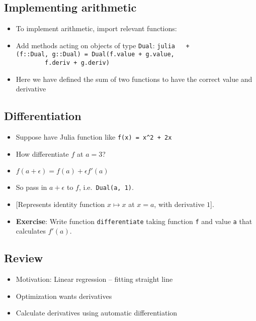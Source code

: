 \hypertarget{implementing-arithmetic}{%
\subsection{Implementing arithmetic}\label{implementing-arithmetic}}

\begin{itemize}
\item
  To implement arithmetic, import relevant functions:

\begin{Shaded}
\begin{Highlighting}[]
\end{Highlighting}
\end{Shaded}
\item
  Add methods acting on objects of type \texttt{Dual}:
  \texttt{julia\ \ \ +(f::Dual,\ g::Dual)\ =\ Dual(f.value\ +\ g.value,\ \ \ \ \ \ \ \ \ \ \ \ \ \ \ \ \ \ \ \ \ \ \ \ \ \ \ \ \ \ \ f.deriv\ +\ g.deriv)}
\item
  Here we have defined the sum of two functions to have the correct
  value and derivative
\end{itemize}

\hypertarget{differentiation}{%
\subsection{Differentiation}\label{differentiation}}

\begin{itemize}
\item
  Suppose have Julia function like \texttt{f(x)\ =\ x\^{}2\ +\ 2x}
\item
  How differentiate \(f\) at \(a = 3\)?
\item
  \(f(a + \epsilon) = f(a) + \epsilon f'(a)\)
\item
  So pass in \(a + \epsilon\) to \(f\), i.e.~\texttt{Dual(a,\ 1)}.
\item
  {[}Represents identity function \(x \mapsto x\) at \(x=a\), with
  derivative \(1\){]}.
\item
  \textbf{Exercise}: Write function \texttt{differentiate} taking
  function \texttt{f} and value \texttt{a} that calculates \(f'(a)\).
\end{itemize}

\hypertarget{review}{%
\subsection{Review}\label{review}}

\begin{itemize}
\item
  Motivation: Linear regression -- fitting straight line
\item
  Optimization wants derivatives
\item
  Calculate derivatives using automatic differentiation
\end{itemize}
